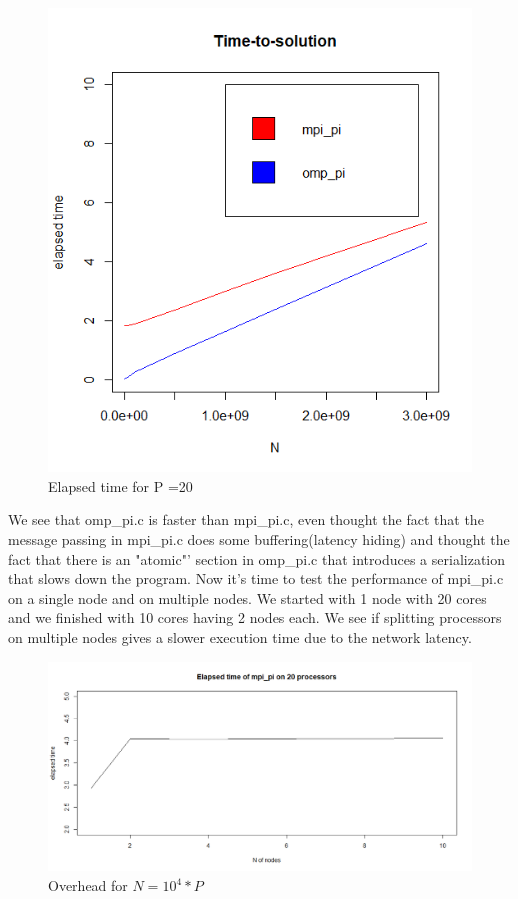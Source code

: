 \documentclass{article}
\begin{document}
\begin{figure}[H] %
	\centering
	\includegraphics[width=0.8\columnwidth]{graphs/time_to_solution} %
	\caption{Elapsed time for P =20}
\end{figure}
We see that omp\_pi.c is faster than mpi\_pi.c, even thought the fact that the message passing in mpi\_pi.c does some buffering(latency hiding) and thought the fact that there is an "atomic"' section in omp\_pi.c that introduces a serialization that slows down the program.
Now it's time to test the performance of mpi\_pi.c on a single node and on multiple nodes. We started with 1 node with 20 cores and we finished with 10 cores having 2 nodes each. We see if splitting processors on multiple nodes gives a slower execution time due to the network latency.

\begin{figure}[H] %
	\centering
	\includegraphics[width=0.8\columnwidth]{graphs/mpi_pi_elaps_time_on_nodes} %
	\caption{Overhead for $N=10^4*P$}
\end{figure}
\end{document}
